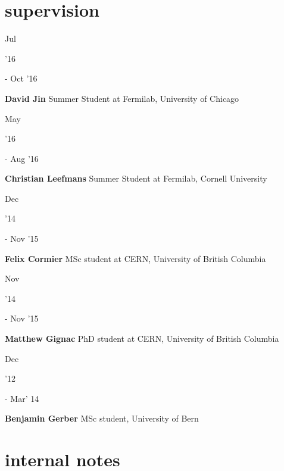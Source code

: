 \documentclass[]{cv} %
\begin{document}
\section{supervision}

\begin{entrylist}

  \entry
  {\parbox[t]{\parboxWidthOne}{Jul}\parbox[t]{\parboxWidthTwo}{\hfill '16} - Oct '16}
  {\textbf{David Jin}}
  {}
  {Summer Student at Fermilab, University of Chicago}

  \entry
  {\parbox[t]{\parboxWidthOne}{May}\parbox[t]{\parboxWidthTwo}{\hfill '16} - Aug '16}
  {\textbf{Christian Leefmans}}
  {}
  {Summer Student at Fermilab, Cornell University}

  \entry
  {\parbox[t]{\parboxWidthOne}{Dec}\parbox[t]{\parboxWidthTwo}{\hfill '14} - Nov '15}
  {\textbf{Felix Cormier}}
  {}
  {MSc student at CERN, University of British Columbia}

  \entry
  {\parbox[t]{\parboxWidthOne}{Nov}\parbox[t]{\parboxWidthTwo}{\hfill '14} - Nov '15}
  {\textbf{Matthew Gignac}}
  {}
  {PhD student at CERN, University of British Columbia}

  \entry
  {\parbox[t]{\parboxWidthOne}{Dec}\parbox[t]{\parboxWidthTwo}{\hfill '12} - Mar' 14}
  {\textbf{Benjamin Gerber}}
  {}
  {MSc student, University of Bern}

\end{entrylist}

\ifinternalNotes
\section{internal notes}
\end{document}
